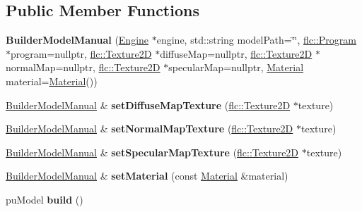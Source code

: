 \subsection*{Public Member Functions}
\begin{DoxyCompactItemize}
\item 
{\bfseries Builder\+Model\+Manual} (\hyperlink{classflw_1_1Engine}{Engine} $\ast$engine, std\+::string model\+Path=\char`\"{}\char`\"{}, \hyperlink{classflw_1_1flc_1_1Program}{flc\+::\+Program} $\ast$program=nullptr, \hyperlink{classflw_1_1flc_1_1Texture2D}{flc\+::\+Texture2D} $\ast$diffuse\+Map=nullptr, \hyperlink{classflw_1_1flc_1_1Texture2D}{flc\+::\+Texture2D} $\ast$normal\+Map=nullptr, \hyperlink{classflw_1_1flc_1_1Texture2D}{flc\+::\+Texture2D} $\ast$specular\+Map=nullptr, \hyperlink{classflw_1_1flf_1_1Material}{Material} material=\hyperlink{classflw_1_1flf_1_1Material}{Material}())\hypertarget{classflw_1_1flf_1_1BuilderModelManual_abb0c94af4b0f544fcde71ce11129fe58}{}\label{classflw_1_1flf_1_1BuilderModelManual_abb0c94af4b0f544fcde71ce11129fe58}

\item 
\hyperlink{classflw_1_1flf_1_1BuilderModelManual}{Builder\+Model\+Manual} \& {\bfseries set\+Diffuse\+Map\+Texture} (\hyperlink{classflw_1_1flc_1_1Texture2D}{flc\+::\+Texture2D} $\ast$texture)\hypertarget{classflw_1_1flf_1_1BuilderModelManual_ac147d3e5a9adcf0561d3831f44b592f3}{}\label{classflw_1_1flf_1_1BuilderModelManual_ac147d3e5a9adcf0561d3831f44b592f3}

\item 
\hyperlink{classflw_1_1flf_1_1BuilderModelManual}{Builder\+Model\+Manual} \& {\bfseries set\+Normal\+Map\+Texture} (\hyperlink{classflw_1_1flc_1_1Texture2D}{flc\+::\+Texture2D} $\ast$texture)\hypertarget{classflw_1_1flf_1_1BuilderModelManual_a472cbfc8bdb0bf654f761e21f6f19838}{}\label{classflw_1_1flf_1_1BuilderModelManual_a472cbfc8bdb0bf654f761e21f6f19838}

\item 
\hyperlink{classflw_1_1flf_1_1BuilderModelManual}{Builder\+Model\+Manual} \& {\bfseries set\+Specular\+Map\+Texture} (\hyperlink{classflw_1_1flc_1_1Texture2D}{flc\+::\+Texture2D} $\ast$texture)\hypertarget{classflw_1_1flf_1_1BuilderModelManual_acdd90ebb159ce182c9b970ca54371708}{}\label{classflw_1_1flf_1_1BuilderModelManual_acdd90ebb159ce182c9b970ca54371708}

\item 
\hyperlink{classflw_1_1flf_1_1BuilderModelManual}{Builder\+Model\+Manual} \& {\bfseries set\+Material} (const \hyperlink{classflw_1_1flf_1_1Material}{Material} \&material)\hypertarget{classflw_1_1flf_1_1BuilderModelManual_a3b3abbd5aca8f472306aaa8f195468ff}{}\label{classflw_1_1flf_1_1BuilderModelManual_a3b3abbd5aca8f472306aaa8f195468ff}

\item 
pu\+Model {\bfseries build} ()\hypertarget{classflw_1_1flf_1_1BuilderModelManual_a439cfce3c4cef0ae98ac15be6e40e710}{}\label{classflw_1_1flf_1_1BuilderModelManual_a439cfce3c4cef0ae98ac15be6e40e710}

\end{DoxyCompactItemize}
